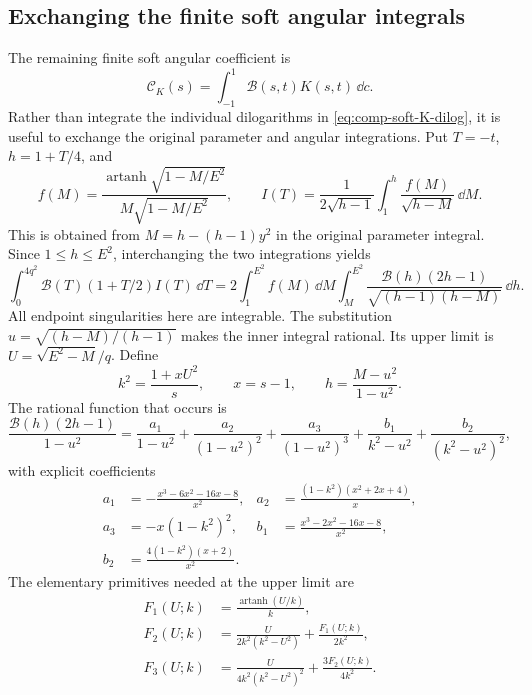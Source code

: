 \subsection{Exchanging the finite soft angular integrals}
\label{sec:comp-soft-angular-exchange}
The remaining finite soft angular coefficient is
\begin{equation}
 \mathcal C_K(s)=\int_{-1}^1\mathcal B(s,t)K(s,t)\,\dd c.
\end{equation}
Rather than integrate the individual dilogarithms in
\eqref{eq:comp-soft-K-dilog}, it is useful to exchange the original
parameter and angular integrations. Put $T=-t$, $h=1+T/4$, and
\begin{equation}
 f(M)=\frac{\operatorname{artanh}\sqrt{1-M/E^2}}
 {M\sqrt{1-M/E^2}},\qquad
 I(T)=\frac1{2\sqrt{h-1}}\int_1^h\frac{f(M)}{\sqrt{h-M}}\,\dd M.
\end{equation}
This is obtained from $M=h-(h-1)y^2$ in the original parameter integral.
Since $1\leq h\leq E^2$, interchanging the two integrations yields
\begin{equation}
 \int_0^{4q^2}\mathcal B(T)(1+T/2)I(T)\,\dd T
 =2\int_1^{E^2}f(M)\,\dd M
 \int_M^{E^2}\frac{\mathcal B(h)(2h-1)}
 {\sqrt{(h-1)(h-M)}}\,\dd h.
\end{equation}
All endpoint singularities here are integrable. The substitution
$u=\sqrt{(h-M)/(h-1)}$ makes the inner integral rational. Its upper
limit is $U=\sqrt{E^2-M}/q$. Define
\begin{equation}
 k^2=\frac{1+xU^2}{s},\qquad x=s-1,
 \qquad h=\frac{M-u^2}{1-u^2}.
\end{equation}
The rational function that occurs is
\begin{equation}
 \frac{\mathcal B(h)(2h-1)}{1-u^2}
 =\frac{a_1}{1-u^2}+\frac{a_2}{(1-u^2)^2}
 +\frac{a_3}{(1-u^2)^3}
 +\frac{b_1}{k^2-u^2}+\frac{b_2}{(k^2-u^2)^2},
\end{equation}
with explicit coefficients
\begin{align}
 a_1&=-\frac{x^3-6x^2-16x-8}{x^2},
 &a_2&=\frac{(1-k^2)(x^2+2x+4)}x,\\
 a_3&=-x(1-k^2)^2,
 &b_1&=\frac{x^3-2x^2-16x-8}{x^2},\\
 b_2&=\frac{4(1-k^2)(x+2)}{x^2}.
\end{align}
The elementary primitives needed at the upper limit are
\begin{align}
 F_1(U;k)&=\frac{\operatorname{artanh}(U/k)}k,\\
 F_2(U;k)&=\frac{U}{2k^2(k^2-U^2)}+\frac{F_1(U;k)}{2k^2},\\
 F_3(U;k)&=\frac{U}{4k^2(k^2-U^2)^2}+\frac{3F_2(U;k)}{4k^2}.
\end{align}
